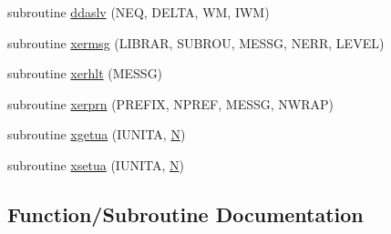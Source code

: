 \begin{DoxyCompactItemize}
\item 
subroutine \hyperlink{ddassl_8f_ae6a72d3bfd6e3a57f7716e162e40ab42}{ddaslv} (N\+E\+Q, D\+E\+L\+T\+A, W\+M, I\+W\+M)
\item 
subroutine \hyperlink{ddassl_8f_a0dff1ee0d7c9a093c254a258ba964e7f}{xermsg} (L\+I\+B\+R\+A\+R, S\+U\+B\+R\+O\+U, M\+E\+S\+S\+G, N\+E\+R\+R, L\+E\+V\+E\+L)
\item 
subroutine \hyperlink{ddassl_8f_ac0ca67b491a0fde980c95e70469bbeeb}{xerhlt} (M\+E\+S\+S\+G)
\item 
subroutine \hyperlink{ddassl_8f_a6387ac6530dca803bef01db49aa0492c}{xerprn} (P\+R\+E\+F\+I\+X, N\+P\+R\+E\+F, M\+E\+S\+S\+G, N\+W\+R\+A\+P)
\item 
subroutine \hyperlink{ddassl_8f_a7048c9c37b8ecd9b5f1ba805ada35082}{xgetua} (I\+U\+N\+I\+T\+A, \hyperlink{polmisc_8c_a0240ac851181b84ac374872dc5434ee4}{N})
\item 
subroutine \hyperlink{ddassl_8f_aeeefe6d1bdc66b1a1f8eb441baaad37c}{xsetua} (I\+U\+N\+I\+T\+A, \hyperlink{polmisc_8c_a0240ac851181b84ac374872dc5434ee4}{N})
\end{DoxyCompactItemize}


\subsection{Function/\+Subroutine Documentation}
\hypertarget{ddassl_8f_a63e4fe787311c5e21d9dd1751203080b}{}
